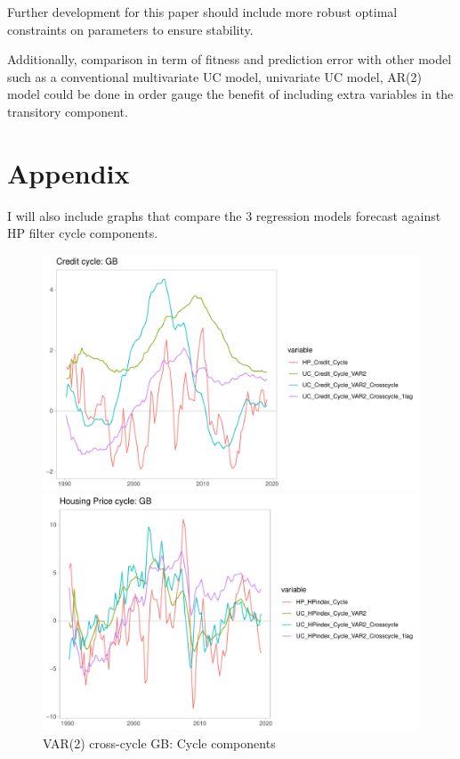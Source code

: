 \documentclass[fleqn]{article}
\begin{document}
\begin{outline}[enumerate]
		Further development for this paper should include more robust optimal constraints on parameters to ensure stability. 
		
		Additionally, comparison in term of fitness and prediction error with other model such as a conventional multivariate UC model, univariate UC model, AR(2) model could be done in order gauge the benefit of including extra variables in the transitory component.
		
				
		\section*{Appendix}

		I will also include graphs that compare the 3 regression models forecast against HP filter cycle components.
		
		\clearpage
		
		
		
		\begin{figure}[h!]
			\caption{VAR(2) cross-cycle GB: Cycle components}	
			\centerline{\includegraphics[scale=0.7]{../Graphs/Credit_cycle_GB.pdf}}
			\centerline{\includegraphics[scale=0.7]{../Graphs/HP_cycle_GB.pdf}}
		\end{figure}
		

\end{outline}
\end{document}
